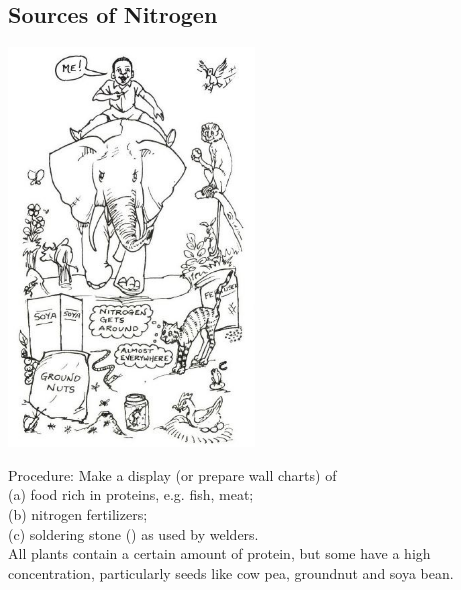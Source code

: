 \begin{multicols}{2}
\subsection{Sources of Nitrogen}

\begin{center}
\includegraphics[width=0.49\textwidth]{./img/source/nitrogen-sources.jpg}
\end{center}

\begin{description*}
\item[Procedure:]{Make a display (or prepare wall
charts) of\\
(a) food rich in proteins, e.g. fish, meat;\\
(b) nitrogen fertilizers;\\
(c) soldering stone () as used by welders.\\
All plants contain a certain amount of protein,
but some have a high concentration, particularly
seeds like cow pea, groundnut and soya bean.}
\end{description*}


\end{multicols}


